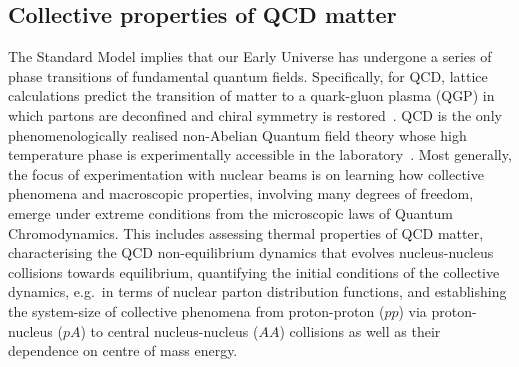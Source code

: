 \subsection{Collective properties of QCD matter}
The Standard Model implies that our Early Universe has undergone a series of phase transitions of fundamental quantum fields. Specifically, for QCD, lattice calculations predict the transition of matter to a quark-gluon plasma (QGP) in which partons are deconfined and chiral symmetry is restored~\cite{Bazavov:2019lgz}. QCD is the only phenomenologically realised non-Abelian Quantum field theory whose high temperature phase is experimentally accessible in the laboratory~\cite{Citron:2018lsq}. Most generally, the focus of experimentation with nuclear beams is on learning how collective phenomena and macroscopic properties, involving many degrees of freedom, emerge under extreme conditions from the microscopic laws of Quantum Chromodynamics. This includes assessing thermal properties of QCD matter, characterising the QCD non-equilibrium dynamics that evolves nucleus-nucleus collisions towards equilibrium, quantifying the initial conditions of the collective dynamics, e.g.\ in terms of nuclear parton distribution functions, and establishing the system-size of collective phenomena from proton-proton ($pp$) via proton-nucleus ($pA$) to central nucleus-nucleus ($AA$) collisions as well as their dependence on centre of mass energy. 

